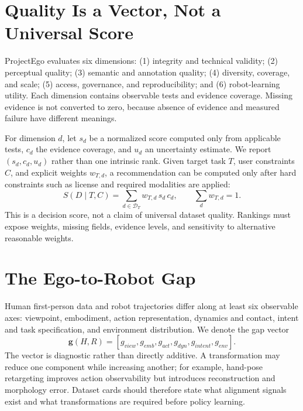 \documentclass{article}
\begin{document}
\section{Quality Is a Vector, Not a Universal Score}

ProjectEgo evaluates six dimensions: (1) integrity and technical validity; (2) perceptual quality; (3) semantic and annotation quality; (4) diversity, coverage, and scale; (5) access, governance, and reproducibility; and (6) robot-learning utility. Each dimension contains observable tests and evidence coverage. Missing evidence is not converted to zero, because absence of evidence and measured failure have different meanings.

For dimension $d$, let $s_d$ be a normalized score computed only from applicable tests, $c_d$ the evidence coverage, and $u_d$ an uncertainty estimate. We report $(s_d,c_d,u_d)$ rather than one intrinsic rank. Given target task $T$, user constraints $C$, and explicit weights $w_{T,d}$, a recommendation can be computed only after hard constraints such as license and required modalities are applied:
\begin{equation}
S(D\mid T,C)=\sum_{d \in \mathcal{D}_T} w_{T,d}\,s_d\,c_d,
\qquad \sum_d w_{T,d}=1.
\end{equation}
This is a decision score, not a claim of universal dataset quality. Rankings must expose weights, missing fields, evidence levels, and sensitivity to alternative reasonable weights.

\section{The Ego-to-Robot Gap}

Human first-person data and robot trajectories differ along at least six observable axes: viewpoint, embodiment, action representation, dynamics and contact, intent and task specification, and environment distribution. We denote the gap vector
\begin{equation}
\mathbf{g}(H,R)=[g_{view},g_{emb},g_{act},g_{dyn},g_{intent},g_{env}].
\end{equation}
The vector is diagnostic rather than directly additive. A transformation may reduce one component while increasing another; for example, hand-pose retargeting improves action observability but introduces reconstruction and morphology error. Dataset cards should therefore state what alignment signals exist and what transformations are required before policy learning.
\end{document}
